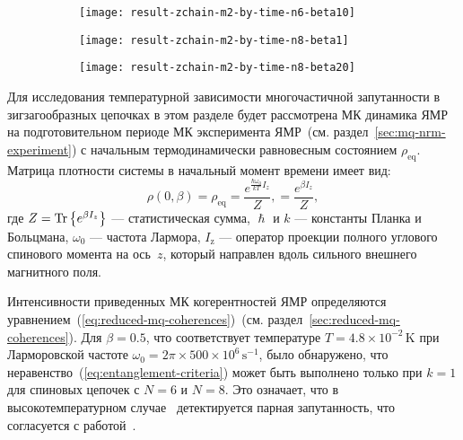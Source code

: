 \begin{figure}[H]
  \begin{subfigure}[t]{0.31\textwidth}
    \texttt{[image: result-zchain-m2-by-time-n6-beta10]}
    \caption{\protect}
    \label{fig:result-zchain-m2-by-time-n6-beta10}
  \end{subfigure}
  \hfill
  \begin{subfigure}[t]{0.32\textwidth}
    \texttt{[image: result-zchain-m2-by-time-n8-beta1]}
    \caption{\protect}
    \label{fig:result-zchain-m2-by-time-n8-beta1}
  \end{subfigure}
  \hfill
  \begin{subfigure}[t]{0.31\textwidth}
    \texttt{[image: result-zchain-m2-by-time-n8-beta20]}
    \caption{\protect}
    \label{fig:result-zchain-m2-by-time-n8-beta20}
  \end{subfigure}
  \caption{\protect}
  \label{fig:result-zchain-m2-by-time-ns-betas}
\end{figure}

Для исследования температурной зависимости многочастичной запутанности
в зигзагообразных цепочках
в этом разделе будет рассмотрена МК динамика ЯМР
на подготовительном периоде МК эксперимента ЯМР~(см. раздел~\ref{sec:mq-nrm-experiment})
с начальным термодинамически равновесным состоянием $\rho_\mathrm{eq}$.
Матрица плотности системы в начальный момент времени имеет вид:
\begin{equation}
  \rho(0, \beta)
  = \rho_\mathrm{eq}
  = \dfrac{e^{\frac{\hbar\omega_{0}}{kT} I_z}}{Z},
  = \dfrac{e^{\beta I_z}}{Z},
\end{equation}
где $Z = \mathrm{Tr} \left\{ e^{\beta I_z} \right\}$ --- статистическая сумма,
$\hslash$ и $k$ --- константы Планка и Больцмана,
$\omega_{0}$ --- частота Лармора,
$I_\mathrm{z}$ ---  оператор проекции полного углового спинового момента  на ось~$z$,
который направлен вдоль сильного внешнего магнитного поля.

Интенсивности приведенных МК когерентностей ЯМР определяются уравнением~(\ref{eq:reduced-mq-coherences})~(см. раздел~\ref{sec:reduced-mq-coherences}).
Для $\beta=0.5$,
что соответствует температуре $T=4.8 \times 10^{-2}\,\mbox{K}$
при Ларморовской частоте $\omega_0=2\pi\times 500\times 10^6 \,\mbox{s}^{-1}$,
было обнаружено,
что неравенство~(\ref{eq:entanglement-criteria}) может быть выполнено только при $k=1$ для спиновых цепочек с $N=6$ и $N=8$.
Это означает, что в высокотемпературном случае~\cite{Doronin2019}
детектируется парная запутанность,
что согласуется с работой~\cite{Feldman2012}.

